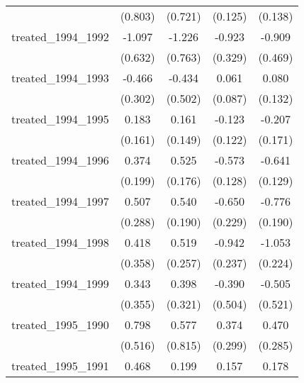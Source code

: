 {\begin{tabular}{l*{4}{c}}
            &     (0.803)         &     (0.721)         &     (0.125)         &     (0.138)         \\
[1em]
treated\_1994\_1992&      -1.097         &      -1.226         &      -0.923\sym{**} &      -0.909         \\
            &     (0.632)         &     (0.763)         &     (0.329)         &     (0.469)         \\
[1em]
treated\_1994\_1993&      -0.466         &      -0.434         &       0.061         &       0.080         \\
            &     (0.302)         &     (0.502)         &     (0.087)         &     (0.132)         \\
[1em]
treated\_1994\_1995&       0.183         &       0.161         &      -0.123         &      -0.207         \\
            &     (0.161)         &     (0.149)         &     (0.122)         &     (0.171)         \\
[1em]
treated\_1994\_1996&       0.374         &       0.525\sym{**} &      -0.573\sym{***}&      -0.641\sym{***}\\
            &     (0.199)         &     (0.176)         &     (0.128)         &     (0.129)         \\
[1em]
treated\_1994\_1997&       0.507         &       0.540\sym{**} &      -0.650\sym{**} &      -0.776\sym{***}\\
            &     (0.288)         &     (0.190)         &     (0.229)         &     (0.190)         \\
[1em]
treated\_1994\_1998&       0.418         &       0.519\sym{*}  &      -0.942\sym{***}&      -1.053\sym{***}\\
            &     (0.358)         &     (0.257)         &     (0.237)         &     (0.224)         \\
[1em]
treated\_1994\_1999&       0.343         &       0.398         &      -0.390         &      -0.505         \\
            &     (0.355)         &     (0.321)         &     (0.504)         &     (0.521)         \\
[1em]
treated\_1995\_1990&       0.798         &       0.577         &       0.374         &       0.470         \\
            &     (0.516)         &     (0.815)         &     (0.299)         &     (0.285)         \\
[1em]
treated\_1995\_1991&       0.468         &       0.199         &       0.157         &       0.178         \\

\end{tabular}}
